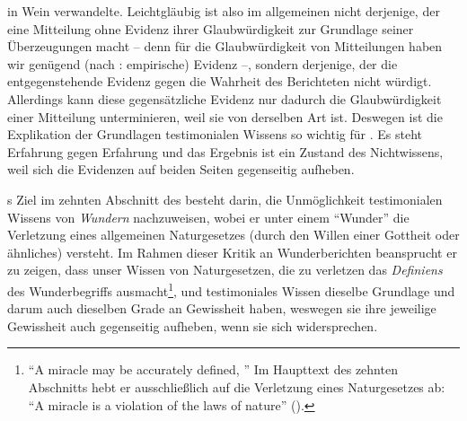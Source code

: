 in Wein verwandelte. Leichtgläubig ist also im allgemeinen nicht derjenige, der
eine Mitteilung ohne Evidenz ihrer Glaubwürdigkeit zur Grundlage seiner
Überzeugungen macht -- denn für die Glaubwürdigkeit von Mitteilungen haben
wir genügend (nach : empirische) Evidenz --, sondern derjenige, der
die entgegenstehende Evidenz gegen die Wahrheit des Berichteten nicht würdigt.
Allerdings kann diese gegensätzliche Evidenz nur dadurch die Glaubwürdigkeit
einer Mitteilung unterminieren, weil sie von derselben Art ist. Deswegen ist die
Explikation der Grundlagen testimonialen Wissens so wichtig für
. Es steht Erfahrung gegen
Erfahrung und das Ergebnis ist ein Zustand des Nichtwissens, weil sich die
Evidenzen auf beiden Seiten gegenseitig aufheben.


s Ziel im zehnten Abschnitt des  besteht darin,
die Unmöglichkeit testimonialen Wissens von \emph{Wundern} nachzuweisen, wobei er
unter einem \enquote{Wunder} die Verletzung eines allgemeinen Naturgesetzes
(durch den Willen einer Gottheit oder ähnliches) versteht. Im Rahmen dieser
Kritik an Wunderberichten beansprucht er zu zeigen, dass unser Wissen von
Naturgesetzen, die zu verletzen das \emph{Definiens} des Wunderbegriffs
ausmacht\footnote{\cite[Vgl.][\pno~93,
Anm.:]{Hume:AnEnquiryConcerningHumanUnderstanding1964} \enquote{A miracle may be
accurately defined, } Im
Haupttext des zehnten Abschnitts hebt er ausschließlich auf die Verletzung eines
Naturgesetzes ab: \enquote{A miracle is a violation of the laws of nature}
(\cite[][93]{Hume:AnEnquiryConcerningHumanUnderstanding1964}).}, und
testimoniales Wissen dieselbe Grundlage und darum auch dieselben Grade an
Gewissheit haben, weswegen sie ihre jeweilige Gewissheit auch gegenseitig
aufheben, wenn sie sich widersprechen.


